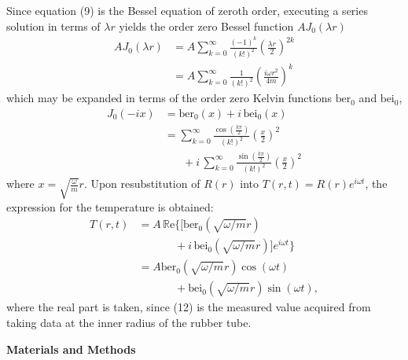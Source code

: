 \documentclass[11pt]{article}
\begin{document}
\begin{multicols}{2}
    Since equation (9) is the Bessel equation of zeroth order, executing a series solution in terms of $\lambda r$ yields the order zero Bessel function $A J_0(\lambda r)$
    \begin{align*}
        AJ_0(\lambda r) &= A\sum_{k=0}^{\infty}\frac{(-1)^k}{(k!)^2}\left(\frac{\lambda r}{2}\right)^{2k} \tag{10.1}  \\
        &=A\sum_{k=0}^{\infty}\frac{1}{(k!)^2}\left(\frac{i\omega r^2}{4m}\right)^{k} \tag{10.2}
    \end{align*}
    \nd which may be expanded in terms of the order zero Kelvin functions $\text{ber}_0$ and $\text{bei}_0$, 
    \begin{align*}
        J_0(-ix) &= \text{ber}_0(x) + i\, \text{bei}_0(x) \tag{11.1}\\ 
        &= \sum_{k=0}^{\infty} \frac{\cos\left(\frac{k\pi}{2}\right)}{(k!)^2}\left(\frac{x}{2}\right)^2\\
        &\hspace{20pt}+ i\, \sum_{k=0}^{\infty} \frac{\sin\left(\frac{k\pi}{2}\right)}{(k!)^2}\left(\frac{x}{2}\right)^2\tag{11.2} 
    \end{align*}
    \nd where $x = \sqrt{\frac{\omega}{m}}r$. Upon resubstitution of $R(r)$ into $T(r,t) = R(r)e^{i\omega t}$, the expression for the temperature is obtained: 
   \begin{align*}
        T(r, t) &= A\, \mathbb{R}\text{e}\bigg\{\bigg[\text{ber}_0(\sqrt{\omega/m}r)\\
        &\hspace{40pt} + i\, \text{bei}_0(\sqrt{\omega/m}r)\bigg]e^{i\omega t}\bigg\} \\
        &=   A\text{ber}_0(\sqrt{\omega/m}r)\cos(\omega t) \\
        & \hspace{40pt} +  \text{bei}_0(\sqrt{\omega/m}r)\sin(\omega t),  \tag{12}
    \end{align*} 
    \nd where the real part is taken, since (12) is the measured value acquired from taking data at the inner radius of the rubber tube.





    \vspace{20pt}

     \selectfont \textbf{Materials and Methods}
    
     \selectfont 


\end{multicols}
\end{document}
